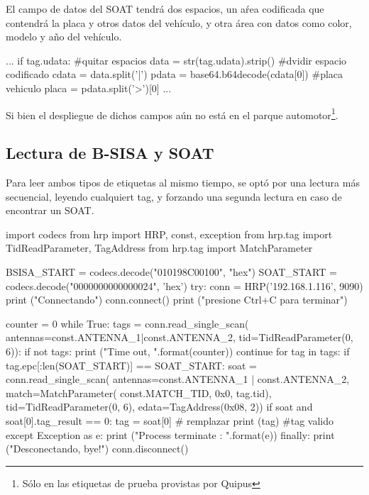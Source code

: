 \documentclass[fleqn,10pt]{SelfArx} %
\begin{document}
El campo de datos del SOAT tendrá dos espacios, un aŕea codificada que contendrá la placa y otros datos del vehículo, y otra área con datos como color, modelo y año del vehículo.
\begin{python}
...
            if tag.udata:
                #quitar espacios
                data = str(tag.udata).strip()
                #dvidir espacio codificado
                cdata = data.split('|')
                pdata = base64.b64decode(cdata[0])
                #placa vehiculo
                placa = pdata.split('>')[0]
...
\end{python}

Si bien el despliegue de dichos campos aún no está en el parque automotor\footnote{Sólo en las etiquetas de prueba provistas por Quipus}.

\subsection*{Lectura de B-SISA y SOAT}

Para leer ambos tipos de etiquetas al mismo tiempo, se optó por una lectura más secuencial, leyendo cualquiert tag, y forzando una segunda lectura en caso de encontrar un SOAT.

\begin{python}
import codecs
from hrp import HRP, const, exception
from hrp.tag import TidReadParameter, TagAddress
from hrp.tag import MatchParameter

BSISA_START = codecs.decode("010198C00100", "hex")
SOAT_START = codecs.decode("0000000000000024",
                               'hex')
try:
    conn = HRP('192.168.1.116', 9090)
    print ("Connectando")
    conn.connect()
    print ("presione Ctrl+C para terminar")

    counter = 0
    while True:
        tags = conn.read_single_scan(
            antennas=const.ANTENNA_1|const.ANTENNA_2,
            tid=TidReadParameter(0, 6)):
        if not tags:
            print ("Time out, {}".format(counter))
            continue
        for tag in tags:
            if tag.epc[:len(SOAT_START)] == SOAT_START:
                soat = conn.read_single_scan(
                    antennas=const.ANTENNA_1 |
                               const.ANTENNA_2,
                    match=MatchParameter(
                                   const.MATCH_TID,
                                   0x0, tag.tid),
                    tid=TidReadParameter(0, 6),
                    edata=TagAddress(0x08, 2))
                if soat and soat[0].tag_result == 0:
                    tag = soat[0] # remplazar
            print (tag) #tag valido
except Exception as e:
    print ("Process terminate : {}".format(e))
finally:
    print ("Desconectando, bye!")
    conn.disconnect()
\end{python}
\end{document}
